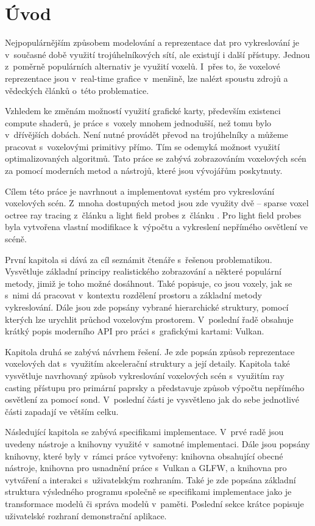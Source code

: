 \chapter{Úvod}
\label{uvod}
Nejpopulárnějším způsobem modelování a reprezentace dat pro vykreslování je v~současné době využití trojúhelníkových sítí, ale existují i další přístupy. Jednou z~poměrně populárních alternativ je využití voxelů. I~přes to, že voxelové reprezentace jsou v~real-time grafice v~menšině, lze nalézt spoustu zdrojů a vědeckých článků o~této problematice.

Vzhledem ke změnám možností využití grafické karty, především existenci compute shaderů, je práce s~voxely mnohem jednodušší, než tomu bylo v~dřívějších dobách. Není nutné provádět převod na trojúhelníky a můžeme pracovat s~voxelovými primitivy přímo. Tím se odemyká možnost využití optimalizovaných algoritmů. Tato práce se zabývá zobrazováním voxelových scén za pomocí moderních metod a nástrojů, které jsou vývojářům poskytnuty.

Cílem této práce je navrhnout a implementovat systém pro vykreslování voxelových scén. Z~mnoha dostupných metod jsou zde využity dvě -- sparse voxel octree ray tracing z~článku \cite{Laine2011EfficientSV} a light field probes z~článku \cite{light_field_probes}. Pro light field probes byla vytvořena vlastní modifikace k~výpočtu a vykreslení nepřímého osvětlení ve scéně.

První kapitola si dává za cíl seznámit čtenáře s~řešenou problematikou. Vysvětluje základní principy realistického zobrazování a některé populární metody, jimiž je toho možné dosáhnout. Také popisuje, co jsou voxely, jak se s~nimi dá pracovat v~kontextu rozdělení prostoru a základní metody vykreslování. Dále jsou zde popsány vybrané hierarchické struktury, pomocí kterých lze urychlit průchod voxelovým prostorem. V~poslední řadě obsahuje krátký popis moderního API pro práci s~grafickými kartami: Vulkan.

Kapitola druhá se zabývá návrhem řešení. Je zde popsán způsob reprezentace voxelových dat s~využitím akcelerační struktury a její detaily. Kapitola také vysvětluje navrhovaný způsob vykreslování voxelových scén s~využitím ray casting přístupu pro primární paprsky a představuje způsob výpočtu nepřímého osvětlení za pomocí sond. V~poslední části je vysvětleno jak do sebe jednotlivé části zapadají ve větším celku.

Následující kapitola se zabývá specifikami implementace. V~prvé radě jsou uvedeny nástroje a knihovny využité v~samotné implementaci. Dále jsou popsány knihovny, které byly v~rámci práce vytvořeny: knihovna obsahující obecné nástroje, knihovna pro usnadnění práce s~Vulkan a GLFW, a knihovna pro vytváření a interakci s~uživatelským rozhraním. Také je zde popsána základní struktura výsledného programu společně se specifikami implementace jako je transformace modelů či správa modelů v~paměti. Poslední sekce krátce popisuje uživatelské rozhraní demonstrační aplikace.

